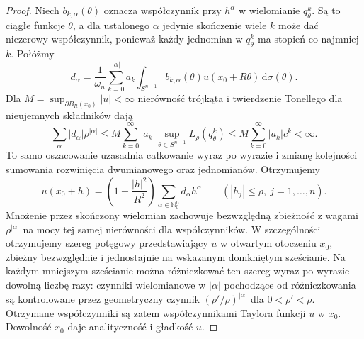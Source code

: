 \begin{proof}
Niech $b_{k,\alpha}(\theta)$ oznacza współczynnik
przy $h^\alpha$ w wielomianie $q_\theta^k$.
Są to ciągłe funkcje $\theta$, a dla ustalonego
$\alpha$ jedynie skończenie wiele $k$ może dać
niezerowy współczynnik, ponieważ każdy jednomian
w $q_\theta^k$ ma stopień co najmniej $k$.
Połóżmy
\[
 d_\alpha=\frac1{\omega_n}
 \sum_{k=0}^{|\alpha|}a_k
 \int_{S^{n-1}} b_{k,\alpha}(\theta)u(x_0+R\theta)
 \,\mathrm d\sigma(\theta).
\]
Dla $M=\sup_{\partial B_R(x_0)}|u|<\infty$
nierówność trójkąta i twierdzenie Tonellego dla
nieujemnych składników dają
\[
 \sum_\alpha |d_\alpha|\rho^{|\alpha|}
 \leq M\sum_{k=0}^\infty |a_k|
 \sup_{\theta\in S^{n-1}}L_\rho(q_\theta^k)
 \leq M\sum_{k=0}^\infty |a_k|c^k<\infty.
\]
To samo oszacowanie uzasadnia całkowanie wyraz po
wyrazie i zmianę kolejności sumowania rozwinięcia
dwumianowego oraz jednomianów. Otrzymujemy
\[
 u(x_0+h)=\left(1-\frac{|h|^2}{R^2}\right)
 \sum_{\alpha\in\mathbb N_0^n}d_\alpha h^\alpha
 \qquad(|h_j|\leq\rho,\ j=1,\ldots,n).
\]
Mnożenie przez skończony wielomian zachowuje
bezwzględną zbieżność z wagami $\rho^{|\alpha|}$
na mocy tej samej nierówności dla współczynników.
W szczególności otrzymujemy szereg potęgowy
przedstawiający $u$ w otwartym otoczeniu $x_0$,
zbieżny bezwzględnie i jednostajnie na wskazanym
domkniętym sześcianie. Na każdym mniejszym sześcianie
można różniczkować ten szereg wyraz po wyrazie
dowolną liczbę razy: czynniki wielomianowe w
$|\alpha|$ pochodzące od różniczkowania są
kontrolowane przez geometryczny czynnik
$(\rho'/\rho)^{|\alpha|}$ dla $0<\rho'<\rho$.
Otrzymane współczynniki są zatem współczynnikami
Taylora funkcji $u$ w $x_0$.
Dowolność $x_0$ daje analityczność i gładkość $u$.
\end{proof}

